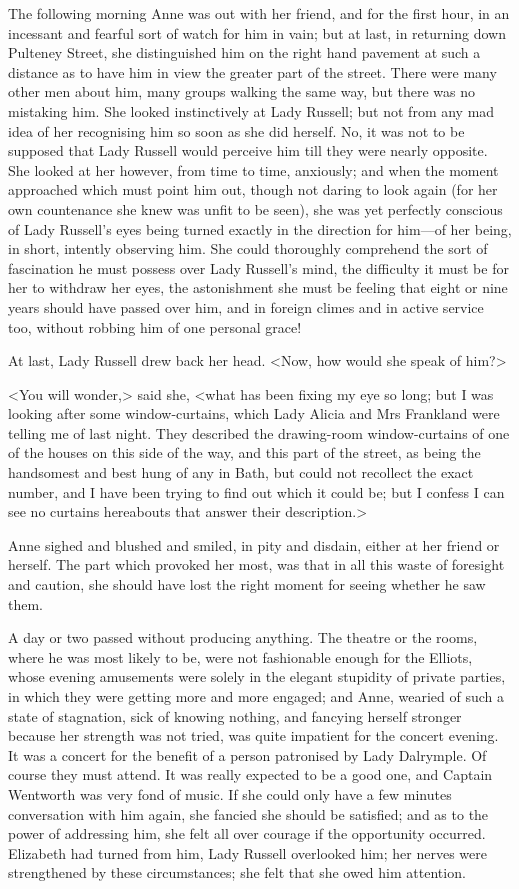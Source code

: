 The following morning Anne was out with her friend, and for the first hour, in an incessant and fearful sort of watch for him in vain; but at last, in returning down Pulteney Street, she distinguished him on the right hand pavement at such a distance as to have him in view the greater part of the street. There were many other men about him, many groups walking the same way, but there was no mistaking him. She looked instinctively at Lady Russell; but not from any mad idea of her recognising him so soon as she did herself. No, it was not to be supposed that Lady Russell would perceive him till they were nearly opposite. She looked at her however, from time to time, anxiously; and when the moment approached which must point him out, though not daring to look again (for her own countenance she knew was unfit to be seen), she was yet perfectly conscious of Lady Russell's eyes being turned exactly in the direction for him—of her being, in short, intently observing him. She could thoroughly comprehend the sort of fascination he must possess over Lady Russell's mind, the difficulty it must be for her to withdraw her eyes, the astonishment she must be feeling that eight or nine years should have passed over him, and in foreign climes and in active service too, without robbing him of one personal grace!

At last, Lady Russell drew back her head. <Now, how would she speak of him?>

<You will wonder,> said she, <what has been fixing my eye so long; but I was looking after some window-curtains, which Lady Alicia and Mrs Frankland were telling me of last night. They described the drawing-room window-curtains of one of the houses on this side of the way, and this part of the street, as being the handsomest and best hung of any in Bath, but could not recollect the exact number, and I have been trying to find out which it could be; but I confess I can see no curtains hereabouts that answer their description.>

Anne sighed and blushed and smiled, in pity and disdain, either at her friend or herself. The part which provoked her most, was that in all this waste of foresight and caution, she should have lost the right moment for seeing whether he saw them.

A day or two passed without producing anything. The theatre or the rooms, where he was most likely to be, were not fashionable enough for the Elliots, whose evening amusements were solely in the elegant stupidity of private parties, in which they were getting more and more engaged; and Anne, wearied of such a state of stagnation, sick of knowing nothing, and fancying herself stronger because her strength was not tried, was quite impatient for the concert evening. It was a concert for the benefit of a person patronised by Lady Dalrymple. Of course they must attend. It was really expected to be a good one, and Captain Wentworth was very fond of music. If she could only have a few minutes conversation with him again, she fancied she should be satisfied; and as to the power of addressing him, she felt all over courage if the opportunity occurred. Elizabeth had turned from him, Lady Russell overlooked him; her nerves were strengthened by these circumstances; she felt that she owed him attention.

